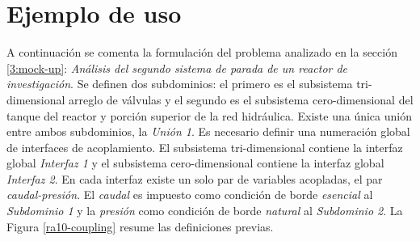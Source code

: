 \section{Ejemplo de uso}
\label{ap1:ejemplo}

A continuación se comenta la formulación del problema analizado en la sección \ref{3:mock-up}:
\textit{Análisis del segundo sistema de parada de un reactor de investigación}.
Se definen dos subdominios: el primero es el subsistema tri-dimensional arreglo de válvulas y el segundo es el subsistema cero-dimensional del tanque del reactor y porción superior de la red hidráulica.
Existe una única unión entre ambos subdominios, la \textit{Unión 1}.
Es necesario definir una numeración global de interfaces de acoplamiento.
El subsistema tri-dimensional contiene la interfaz global \textit{Interfaz 1} y el subsistema cero-dimensional contiene la interfaz global \textit{Interfaz 2}.
En cada interfaz existe un solo par de variables acopladas, el par \textit{caudal-presión}.
El \textit{caudal} es impuesto como condición de borde \textit{esencial} al \textit{Subdominio 1} y la \textit{presión} como condición de borde \textit{natural} al \textit{Subdominio 2}.
La Figura \ref{ra10-coupling} resume las definiciones previas.

